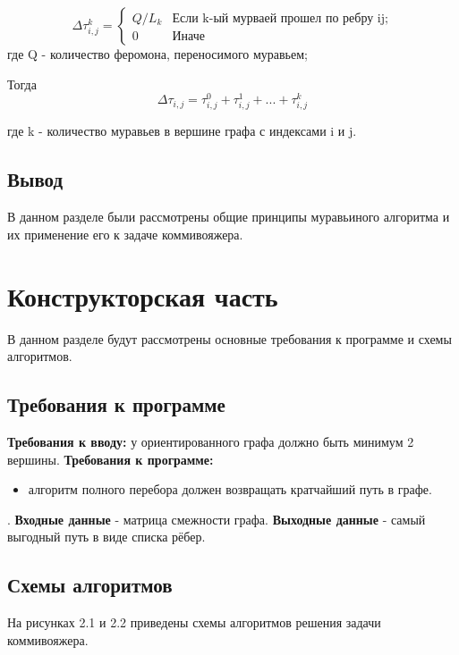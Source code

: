 \documentclass[12pt]{report}
\begin{document}
 \begin{equation}\label{form:add} 
    {\displaystyle \Delta \tau _{i,j}^k={\begin{cases}Q/L_{k}& {\mbox{Если k-ый мурваей прошел по ребру ij;}}\\0&{\mbox{Иначе}}\end{cases}}}
\end{equation}
   где \quad Q - количество феромона, переносимого муравьем;
   
 Тогда
 \begin{equation}\label{form:add1} 
    \Delta \tau _{i,j}= \tau _{i,j}^0 + \tau _{i,j}^1 + ... + \tau _{i,j}^k 
\end{equation}
   
    где k - количество муравьев в вершине графа с индексами i и j.

	
\section*{Вывод}
В данном разделе были рассмотрены общие принципы муравьиного алгоритма и их применение его к задаче коммивояжера. 





\chapter{Конструкторская часть}
В данном разделе будут рассмотрены основные требования к программе и схемы алгоритмов.

\section{Требования к программе}
\textbf{Требования к вводу:}
у ориентированного графа должно быть минимум 2 вершины.
\newline
\textbf{Требования к программе:}
\begin{itemize}
\item алгоритм полного перебора должен возвращать кратчайший путь в графе.
\end{itemize}
 .  
\newline  
\textbf{Входные данные} - матрица смежности графа.  
\newline
\textbf{Выходные данные} - самый выгодный путь в виде списка рёбер.

\section{Схемы алгоритмов}
На рисунках 2.1 и 2.2 приведены схемы алгоритмов решения задачи коммивояжера.\\
\end{document}

